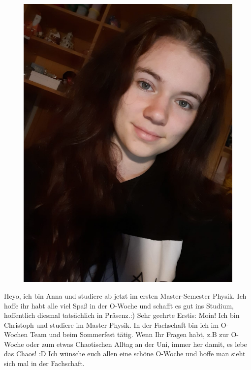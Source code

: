 \begin{multicols}{2}
{\begin{figure}
		\includegraphics[width=\fibelstdlen]{res/vorstellungsfotos/Fotos Selbstvorstellungstexte Fibel/Anna T.JPEG}
	\end{figure}
}
{
Heyo, ich bin Anna und studiere ab jetzt im ersten Master-Semester Physik. 
Ich hoffe ihr habt alle viel Spaß in der O-Woche und schafft es gut ins Studium, hoffentlich diesmal tatsächlich in Präsenz.:)
}
{
Sehr geehrte Erstis: Moin!
Ich bin Christoph und studiere im Master Physik. In der Fachschaft bin ich im O-Wochen Team und beim Sommerfest tätig. Wenn Ihr Fragen habt, z.B zur O-Woche oder zum etwas Chaotischen Alltag an der Uni, immer her damit, es lebe das Chaos! :D 
Ich wünsche euch allen eine schöne O-Woche und hoffe man sieht sich mal in der Fachschaft.
}


\end{multicols}
